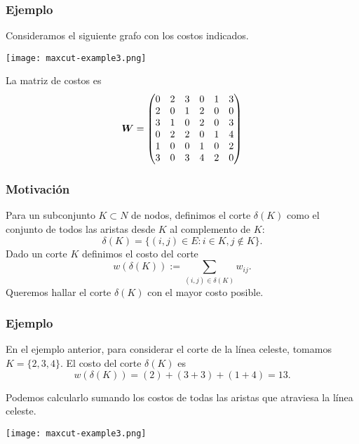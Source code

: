 \documentclass[aspectratio=169,12pt,spanish]{beamer}
\begin{document}
\begin{frame}
\frametitle{Ejemplo}
\begin{minipage}[t]{0.4\textwidth}
Consideramos el siguiente grafo con los costos indicados.
\begin{center}
\texttt{[image: maxcut-example3.png]}
\end{center}
\end{minipage}
\hspace{1cm}
\begin{minipage}[t]{0.4\textwidth}
La matriz de costos es
$$
\bm{W} = \begin{pmatrix}
0 & 2 & 3 & 0 & 1 & 3 \\
2 & 0 & 1 & 2 & 0 & 0 \\
3 & 1 & 0 & 2 & 0 & 3 \\
0 & 2 & 2 & 0 & 1 & 4 \\
1 & 0 & 0 & 1 & 0 & 2 \\
3 & 0 & 3 & 4 & 2 & 0
\end{pmatrix}
$$
\end{minipage}

\end{frame}


\begin{frame}
\frametitle{Motivación}


Para un subconjunto $K \subset N$ de nodos, definimos el corte $\delta(K)$ como el conjunto de todos las aristas desde $K$ al complemento de $K$:
$$
\delta(K) = \{(i,j) \in E : i \in K, j \notin K\}.
$$
Dado un corte $K$ definimos el costo del corte
$$
w(\delta(K)) := \sum_{(i,j) \in \delta(K)} w_{ij}.
$$
Queremos hallar el corte $\delta(K)$ con el mayor costo posible.

\end{frame}


\begin{frame}
\frametitle{Ejemplo}

En el ejemplo anterior, para considerar el corte de la línea celeste, tomamos $K = \{2, 3, 4\}$.
El costo del corte $\delta(K)$ es
$$
w(\delta(K)) = (2) + (3+3) + (1 + 4) = 13.
$$

Podemos calcularlo sumando los costos de todas las aristas que atraviesa la línea celeste.

\begin{center}
\texttt{[image: maxcut-example3.png]}
\end{center}

\end{frame}
\end{document}
